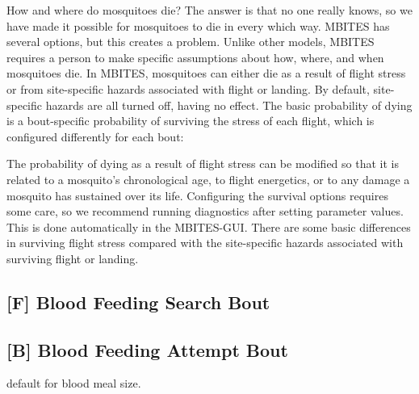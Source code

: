 \documentclass{article}
\begin{document}
How and where do mosquitoes die? The answer is that no one really knows, so we have made it possible for mosquitoes to die in every which way. MBITES has several options, but this creates a problem. Unlike other models, MBITES requires a person to make specific assumptions about how, where, and when mosquitoes die. In MBITES, mosquitoes can either die as a result of flight stress or from site-specific hazards associated with flight or landing. By default, site-specific hazards are all turned off, having no effect. The basic probability of dying is a bout-specific probability of surviving the stress of each flight, which is configured differently for each bout:
The probability of dying as a result of flight stress can be modified so that it is related to a mosquito's chronological age, to flight energetics, or to any damage a mosquito has sustained over its life. Configuring the survival options requires some care, so we recommend running diagnostics after setting parameter values. This is done automatically in the MBITES-GUI. There are some basic differences in surviving flight stress compared with the site-specific hazards associated with surviving flight or landing.



\subsection*{[F] Blood Feeding Search Bout}



\subsection*{[B] Blood Feeding Attempt Bout}

default for blood meal size. 

\end{document}
